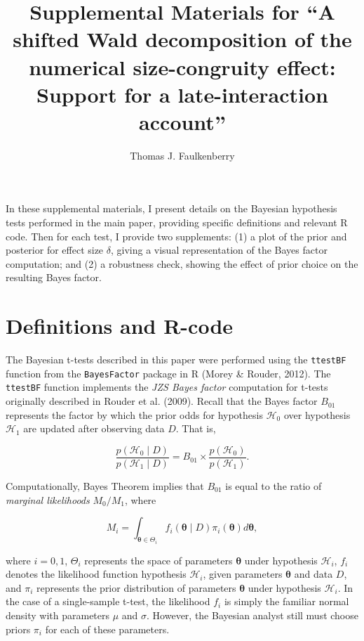 \documentclass[english,floatsintext,doc]{apa6}
\title{Supplemental Materials for ``A shifted Wald decomposition of the
numerical size-congruity effect: Support for a late-interaction
account''}
\author{Thomas J. Faulkenberry}
\affiliation{
    \vspace{0.5cm}
          \textsuperscript{} Tarleton State University  }
\theoremstyle{definition}
\theoremstyle{definition}
\theoremstyle{definition}
\theoremstyle{remark}
\begin{document}
\maketitle

\setcounter{secnumdepth}{0}



In these supplemental materials, I present details on the Bayesian
hypothesis tests performed in the main paper, providing specific
definitions and relevant R code. Then for each test, I provide two
supplements: (1) a plot of the prior and posterior for effect size
\(\delta\), giving a visual representation of the Bayes factor
computation; and (2) a robustness check, showing the effect of prior
choice on the resulting Bayes factor.

\section{Definitions and R-code}\label{definitions-and-r-code}

The Bayesian t-tests described in this paper were performed using the
\texttt{ttestBF} function from the \texttt{BayesFactor} package in R
(Morey \& Rouder, 2012). The \texttt{ttestBF} function implements the
\emph{JZS Bayes factor} computation for t-tests originally described in
Rouder et al. (2009). Recall that the Bayes factor \(B_{01}\) represents
the factor by which the prior odds for hypothesis \(\mathcal{H}_0\) over
hypothesis \(\mathcal{H}_1\) are updated after observing data \(D\).
That is,

\[
\frac{p(\mathcal{H}_0\mid D)}{p(\mathcal{H}_1\mid D)} = B_{01} \times \frac{p(\mathcal{H}_0)}{p(\mathcal{H}_1)}.
\]

\noindent
Computationally, Bayes Theorem implies that \(B_{01}\) is equal to the
ratio of \emph{marginal likelihoods} \(M_0/M_1\), where

\[
M_i = \int_{\bm{\theta}\in \Theta_i} f_i(\bm{\theta}\mid D)\pi_i(\bm{\theta})d\bm{\theta},
\]

\noindent
where \(i=0,1\), \(\Theta_i\) represents the space of parameters
\(\bm{\theta}\) under hypothesis \(\mathcal{H}_i\), \(f_i\) denotes the
likelihood function hypothesis \(\mathcal{H}_i\), given parameters
\(\bm{\theta}\) and data \(D\), and \(\pi_i\) represents the prior
distribution of parameters \(\bm{\theta}\) under hypothesis
\(\mathcal{H}_i\). In the case of a single-sample t-test, the likelihood
\(f_i\) is simply the familiar normal density with parameters \(\mu\)
and \(\sigma\). However, the Bayesian analyst still must choose priors
\(\pi_i\) for each of these parameters.
\end{document}
